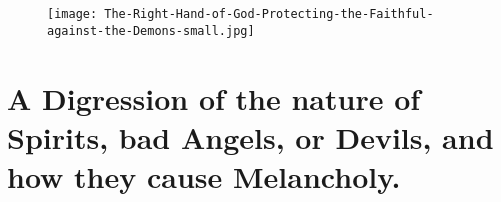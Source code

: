 \cleartoleftpage{}
\begin{figure}[p!]
  \begingroup
  \centering
  \texttt{[image: The-Right-Hand-of-God-Protecting-the-Faithful-against-the-Demons-small.jpg]}
  \label{fig:therighthandofgod}
\end{figure}

\clearpage{}
\thispagestyle{titleontop}

\section[Nature of bad Angels, or Devils]{A Digression of the nature of Spirits, bad Angels, or Devils, and how they cause Melancholy.}

